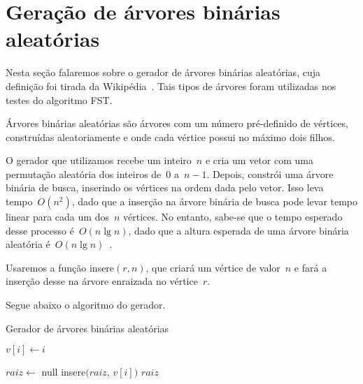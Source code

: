 \section {Geração de árvores binárias aleatórias}

Nesta seção falaremos sobre o gerador de árvores binárias 
aleatórias, cuja definição foi tirada
da Wikipédia~\cite{rbt}. Tais tipos de árvores foram utilizadas nos 
testes do algoritmo FST.

Árvores binárias aleatórias são árvores com um número 
pré-definido de vértices, construídas aleatoriamente e 
onde cada vértice possui no máximo dois filhos.

O gerador que utilizamos recebe um inteiro~$n$ e cria um vetor
com uma permutação aleatória dos inteiros de~$0$ a~$n-1$.
Depois, constrói uma árvore binária de busca, inserindo 
os vértices na ordem dada pelo vetor.
Isso leva tempo~$O(n^2)$, dado que a inserção na árvore 
binária de busca pode levar tempo linear para cada um dos~$n$ 
vértices.
No entanto, sabe-se que o tempo esperado desse processo
é~$O(n\lg n)$, dado que a altura esperada de uma 
árvore binária aleatória é~$O(n\lg n)$~\cite{cormen2009introduction}.

Usaremos a função {\sc insere}$(r, n)$, que criará
um vértice de valor~$n$ e fará a inserção desse na árvore
enraizada no vértice~$r$.

Segue abaixo o algoritmo do gerador.

\bigskip
\begin{algorithm}[H]
\label{alg:ABAgenerator}

	\caption{Gerador de árvores binárias aleatórias}
	{
		$v[i] \gets i$\;
	}

	$raiz\gets$ {\sc null}\;
	{
		{\sc insere}$(raiz$, $v[i])$\;
	}
	\Return $raiz$\;

\end{algorithm}	

\bigskip
\bigskip
\bigskip

